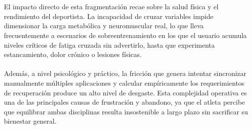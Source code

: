 \documentclass[12pt]{article}
\begin{document}
\\\\
El impacto directo de esta fragmentación recae sobre la salud física y el rendimiento del deportista. La incapacidad de cruzar variables impide dimensionar la carga metabólica y neuromuscular real, lo que lleva frecuentemente a escenarios de sobreentrenamiento en los que el usuario acumula niveles críticos de fatiga cruzada sin advertirlo, hasta que experimenta estancamiento, dolor crónico o lesiones físicas.
\\\\
Además, a nivel psicológico y práctico, la fricción que genera intentar sincronizar manualmente múltiples aplicaciones y calcular empíricamente los requerimientos de recuperación produce un alto nivel de desgaste. Esta complejidad operativa es una de las principales causas de frustración y abandono, ya que el atleta percibe que equilibrar ambas disciplinas resulta insostenible a largo plazo sin sacrificar su bienestar general.
\newpage
\end{document}

